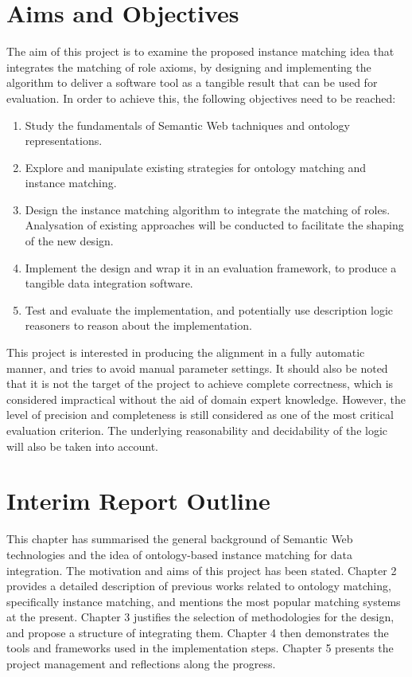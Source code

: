 \section{Aims and Objectives}

The aim of this project is to examine the proposed instance matching idea that integrates the matching of role axioms, by designing and implementing the algorithm to deliver a software tool as a tangible result that can be used for evaluation. In order to achieve this, the following objectives need to be reached:

\begin{spacing}{1.2}
\begin{enumerate}
	\item Study the fundamentals of Semantic Web tachniques and ontology representations.
	\item Explore and manipulate existing strategies for ontology matching and instance matching.
	\item Design the instance matching algorithm to integrate the matching of roles. Analysation of existing approaches will be conducted to facilitate the shaping of the new design.
	\item Implement the design and wrap it in an evaluation framework, to produce a tangible data integration software.
	\item Test and evaluate the implementation, and potentially use description logic reasoners to reason about the implementation.
\end{enumerate}
\end{spacing}

This project is interested in producing the alignment in a fully automatic manner, and tries to avoid manual parameter settings. It should also be noted that it is not the target of the project to achieve complete correctness, which is considered impractical without the aid of domain expert knowledge. However, the level of precision and completeness is still considered as one of the most critical evaluation criterion. The underlying reasonability and decidability of the logic will also be taken into account.


\section{Interim Report Outline}

This chapter has summarised the general background of Semantic Web technologies and the idea of ontology-based instance matching for data integration. The motivation and aims of this project has been stated. Chapter 2 provides a detailed description of previous works related to ontology matching, specifically instance matching, and mentions the most popular matching systems at the present. Chapter 3 justifies the selection of methodologies for the design, and propose a structure of integrating them. Chapter 4 then demonstrates the tools and frameworks used in the implementation steps. Chapter 5 presents the project management and reflections along the progress.
